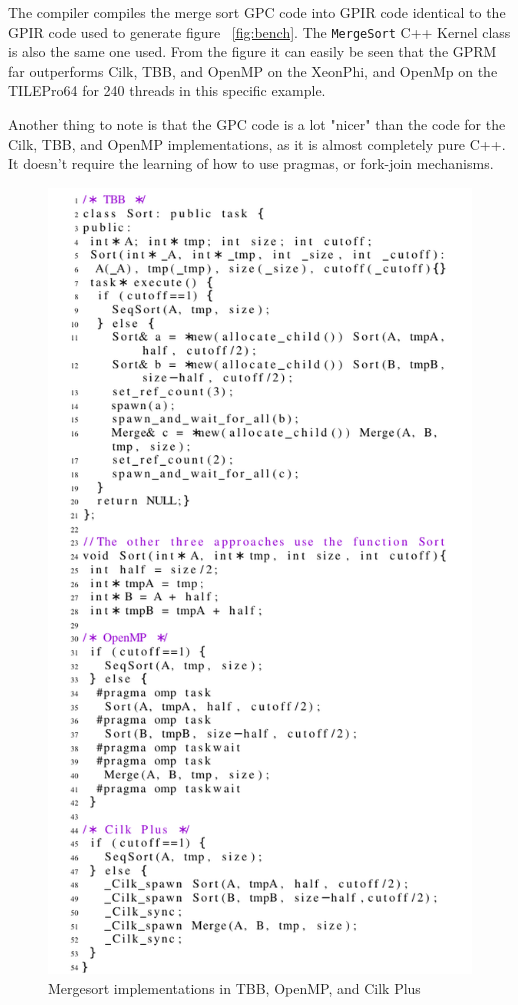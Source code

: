 The compiler compiles the merge sort GPC code into GPIR code identical to the GPIR code used to generate figure ~\ref{fig:bench}.
The \texttt{MergeSort} C++ Kernel class is also the same one used. From the figure it can easily be seen that the GPRM
far outperforms Cilk, TBB, and OpenMP on the XeonPhi, and OpenMp on the TILEPro64 for 240 threads in this specific example. 

Another thing to note is that the GPC code is a lot "nicer" than the code for the Cilk, TBB, and OpenMP
implementations, as it is almost completely pure C++.  It doesn't require the learning of how to use pragmas, 
or fork-join mechanisms.

\begin{figure}[!htb]
\includegraphics{graphs/merge.pdf}
\caption{Mergesort implementations in TBB, OpenMP, and Cilk Plus \cite{GPRMBench}}
\end{figure}



